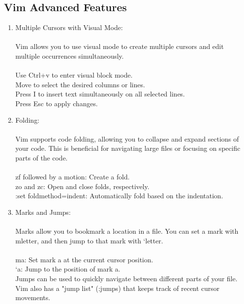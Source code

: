 \documentclass[titlepage]{article}
\begin{document}
\subsection{Vim Advanced Features}
\begin{enumerate}
\item Multiple Cursors with Visual Mode:\\\\

Vim allows you to use visual mode to create multiple cursors and edit multiple occurrences simultaneously.\\\\

Use Ctrl+v to enter visual block mode.\\
Move to select the desired columns or lines.\\
Press I to insert text simultaneously on all selected lines.\\
Press Esc to apply changes.
\item Folding:\\\\

Vim supports code folding, allowing you to collapse and expand sections of your code. This is beneficial for navigating large files or focusing on specific parts of the code.\\\\

zf followed by a motion: Create a fold.\\
zo and zc: Open and close folds, respectively.\\
:set foldmethod=indent: Automatically fold based on the indentation.\\
\item Marks and Jumps:\\\\

Marks allow you to bookmark a location in a file. You can set a mark with m{letter}, and then jump to that mark with `{letter}.\\\\

ma: Set mark a at the current cursor position.\\
`a: Jump to the position of mark a.\\
Jumps can be used to quickly navigate between different parts of your file. Vim also has a "jump list" (:jumps) that keeps track of recent cursor movements.\\
\end{enumerate}
\end{document}
